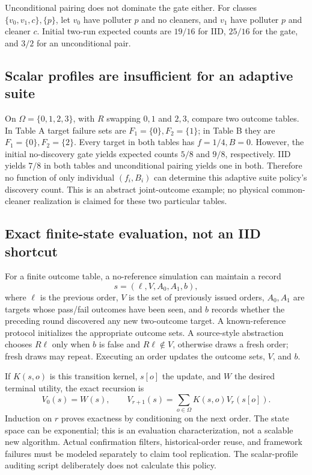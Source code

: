\documentclass[11pt,a4paper]{article}
\theoremstyle{definition}\newtheorem{definition}[theorem]{Definition}
\theoremstyle{remark}\newtheorem{remark}[theorem]{Remark}
\theoremstyle{definition}\newtheorem{xexample}[xtheorem]{Example}\theoremstyle{plain}
\begin{document}
Unconditional pairing does not dominate the gate either. For classes $\{v_0,v_1,c\},\{p\}$, let $v_0$ have polluter $p$ and no cleaners, and $v_1$ have polluter $p$ and cleaner $c$. Initial two-run expected counts are $19/16$ for IID, $25/16$ for the gate, and $3/2$ for an unconditional pair.

\subsection{Scalar profiles are insufficient for an adaptive suite}
On $\Omega=\{0,1,2,3\}$, with $R$ swapping $0,1$ and $2,3$, compare two outcome tables. In Table A target failure sets are $F_1=\{0\},F_2=\{1\}$; in Table B they are $F_1=\{0\},F_2=\{2\}$. Every target in both tables has $f=1/4,B=0$. However, the initial no-discovery gate yields expected counts $5/8$ and $9/8$, respectively. IID yields $7/8$ in both tables and unconditional pairing yields one in both. Therefore no function of only individual $(f_i,B_i)$ can determine this adaptive suite policy's discovery count. This is an abstract joint-outcome example; no physical common-cleaner realization is claimed for these two particular tables.

\subsection{Exact finite-state evaluation, not an IID shortcut}
For a finite outcome table, a no-reference simulation can maintain a record
\[
 s=(\ell,V,A_0,A_1,b),
\]
where $\ell$ is the previous order, $V$ is the set of previously issued orders, $A_0,A_1$ are targets whose pass/fail outcomes have been seen, and $b$ records whether the preceding round discovered any new two-outcome target. A known-reference protocol initializes the appropriate outcome sets. A source-style abstraction chooses $R\ell$ only when $b$ is false and $R\ell\notin V$, otherwise draws a fresh order; fresh draws may repeat. Executing an order updates the outcome sets, $V$, and $b$.

If $K(s,o)$ is this transition kernel, $s[o]$ the update, and $W$ the desired terminal utility, the exact recursion is
\[
 V_0(s)=W(s),\qquad V_{r+1}(s)=\sum_{o\in\Omega}K(s,o)V_r(s[o]).
\]
Induction on $r$ proves exactness by conditioning on the next order. The state space can be exponential; this is an evaluation characterization, not a scalable new algorithm. Actual confirmation filters, historical-order reuse, and framework failures must be modeled separately to claim tool replication. The scalar-profile auditing script deliberately does not calculate this policy.
\end{document}
